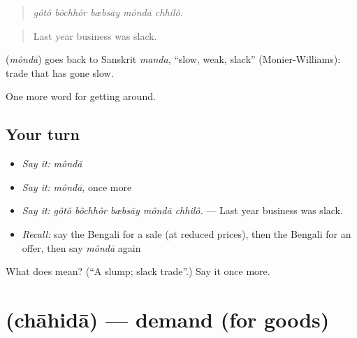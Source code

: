 \begin{quote}
    
\end{quote}

\begin{quote}
\emph{gôtô bôchhôr bæbsāy môndā chhilô.}
\end{quote}

\begin{quote}
Last year business was slack.
\end{quote}

\begin{cousinweb}
\textbf{} (\emph{môndā}) goes back to Sanskrit \emph{manda}, \textquotedblleft{}slow, weak, slack\textquotedblright{} (Monier-Williams): trade that has gone slow.
\end{cousinweb}

\begin{grammarlens}[title={What you've built}]
One more word for getting around.
\end{grammarlens}

\subsection*{Your turn}
\begin{itemize}
\raggedright
  \item \emph{Say it:} \emph{môndā}
  \item \emph{Say it:} \emph{môndā}, once more
  \item \emph{Say it:} \emph{gôtô bôchhôr bæbsāy môndā chhilô.} — Last year business was slack.
  \item \emph{Recall:} say the Bengali for a sale (at reduced prices), then the Bengali for an offer, then say \emph{môndā} again
\end{itemize}

\begin{tcolorbox}[breakable,colback=teal!4,colframe=teal!35!black,title={Before you move on}]
What does  mean? (\textquotedblleft{}A slump; slack trade\textquotedblright{}.) Say it once more.
\end{tcolorbox}
\section[\texorpdfstring{\bn{চাহিদা} (chāhidā)}{চাহিদা (chāhidā)}]{ (chāhidā) — demand (for goods)}

\label{lesson:BN-C424-chahida}



